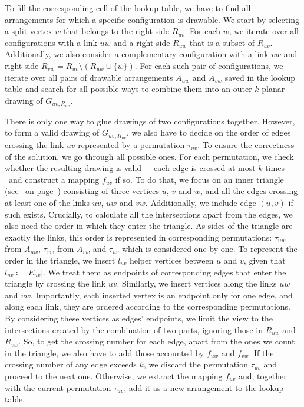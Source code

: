 To fill the corresponding cell of the lookup table, we have to find all arrangements for which a specific configuration is drawable. We start by selecting a split vertex \(w\) that belongs to the right side \(R_{uv}\). For each \(w\), we iterate over all configurations with a link \(uw\) and a right side \(R_{uw}\) that is a subset of \(R_{uv}\). Additionally, we also consider a complementary configuration with a link \(vw\) and right side \(R_{vw} = R_{uv} \setminus (R_{uw} \cup \{w\})\). For each such pair of configurations, we iterate over all pairs of drawable arrangements \(A_{uw}\) and \(A_{vw}\) saved in the lookup table and search for all possible ways to combine them into an outer \(k\)-planar drawing of \(G_{uv, R_{uv}}\).

There is only one way to glue drawings of two configurations together. However, to form a valid drawing of \(G_{uv, R_{uv}}\), we also have to decide on the order of edges crossing the link \(uv\) represented by a permutation \(\tau_{uv}\). To ensure the correctness of the solution, we go through all possible ones. For each permutation, we check whether the resulting drawing is valid~--~each edge is crossed at most \(k\) times~--~and construct a mapping \(f_{uv}\) if so. To do that, we focus on an inner triangle (see~ on page~\pageref{fig:okp:triangle}) consisting of three vertices \(u\), \(v\) and \(w\), and all the edges crossing at least one of the links \(uv\), \(uw\) and \(vw\). Additionally, we include edge \((u, v)\) if such exists. Crucially, to calculate all the intersections apart from the edges, we also need the order in which they enter the triangle. As sides of the triangle are exactly the links, this order is represented in corresponding permutations: \(\tau_{uw}\) from \(A_{uw}\), \(\tau_{vw}\) from \(A_{vw}\) and \(\tau_{uv}\) which is considered one by one. To represent the order in the triangle, we insert \(l_{uv}\) helper vertices between \(u\) and \(v\), given that \(l_{uv}\coloneq|E_{uv}|\). We treat them as endpoints of corresponding edges that enter the triangle by crossing the link \(uv\). Similarly, we insert vertices along the links \(uw\) and \(vw\). Importantly, each inserted vertex is an endpoint only for one edge, and along each link, they are ordered according to the corresponding permutations. By considering these vertices as edges' endpoints, we limit the view to the intersections created by the combination of two parts, ignoring those in \(R_{uw}\) and \(R_{vw}\). So, to get the crossing number for each edge, apart from the ones we count in the triangle, we also have to add those accounted by \(f_{uw}\) and \(f_{vw}\). If the crossing number of any edge exceeds \(k\), we discard the permutation \(\tau_{uv}\) and proceed to the next one. Otherwise, we extract the mapping \(f_{uv}\) and, together with the current permutation \(\tau_{uv}\), add it as a new arrangement to the lookup table.

